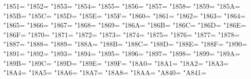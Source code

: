 \XeTeXcharclass"1851=\KclassArabD
\XeTeXcharclass"1852=\KclassArabD
\XeTeXcharclass"1853=\KclassArabD
\XeTeXcharclass"1854=\KclassArabD
\XeTeXcharclass"1855=\KclassArabD
\XeTeXcharclass"1856=\KclassArabD
\XeTeXcharclass"1857=\KclassArabD
\XeTeXcharclass"1858=\KclassArabD
\XeTeXcharclass"1859=\KclassArabD
\XeTeXcharclass"185A=\KclassArabD
\XeTeXcharclass"185B=\KclassArabD
\XeTeXcharclass"185C=\KclassArabD
\XeTeXcharclass"185D=\KclassArabD
\XeTeXcharclass"185E=\KclassArabD
\XeTeXcharclass"185F=\KclassArabD
\XeTeXcharclass"1860=\KclassArabD
\XeTeXcharclass"1861=\KclassArabD
\XeTeXcharclass"1862=\KclassArabD
\XeTeXcharclass"1863=\KclassArabD
\XeTeXcharclass"1864=\KclassArabD
\XeTeXcharclass"1865=\KclassArabD
\XeTeXcharclass"1866=\KclassArabD
\XeTeXcharclass"1867=\KclassArabD
\XeTeXcharclass"1868=\KclassArabD
\XeTeXcharclass"1869=\KclassArabD
\XeTeXcharclass"186A=\KclassArabD
\XeTeXcharclass"186B=\KclassArabD
\XeTeXcharclass"186C=\KclassArabD
\XeTeXcharclass"186D=\KclassArabD
\XeTeXcharclass"186E=\KclassArabD
\XeTeXcharclass"186F=\KclassArabD
\XeTeXcharclass"1870=\KclassArabD
\XeTeXcharclass"1871=\KclassArabD
\XeTeXcharclass"1872=\KclassArabD
\XeTeXcharclass"1873=\KclassArabD
\XeTeXcharclass"1874=\KclassArabD
\XeTeXcharclass"1875=\KclassArabD
\XeTeXcharclass"1876=\KclassArabD
\XeTeXcharclass"1877=\KclassArabD
\XeTeXcharclass"1878=\KclassArabD
\XeTeXcharclass"1887=\KclassArabD
\XeTeXcharclass"1888=\KclassArabD
\XeTeXcharclass"1889=\KclassArabD
\XeTeXcharclass"188A=\KclassArabD
\XeTeXcharclass"188B=\KclassArabD
\XeTeXcharclass"188C=\KclassArabD
\XeTeXcharclass"188D=\KclassArabD
\XeTeXcharclass"188E=\KclassArabD
\XeTeXcharclass"188F=\KclassArabD
\XeTeXcharclass"1890=\KclassArabD
\XeTeXcharclass"1891=\KclassArabD
\XeTeXcharclass"1892=\KclassArabD
\XeTeXcharclass"1893=\KclassArabD
\XeTeXcharclass"1894=\KclassArabD
\XeTeXcharclass"1895=\KclassArabD
\XeTeXcharclass"1896=\KclassArabD
\XeTeXcharclass"1897=\KclassArabD
\XeTeXcharclass"1898=\KclassArabD
\XeTeXcharclass"1899=\KclassArabD
\XeTeXcharclass"189A=\KclassArabD
\XeTeXcharclass"189B=\KclassArabD
\XeTeXcharclass"189C=\KclassArabD
\XeTeXcharclass"189D=\KclassArabD
\XeTeXcharclass"189E=\KclassArabD
\XeTeXcharclass"189F=\KclassArabD
\XeTeXcharclass"18A0=\KclassArabD
\XeTeXcharclass"18A1=\KclassArabD
\XeTeXcharclass"18A2=\KclassArabD
\XeTeXcharclass"18A3=\KclassArabD
\XeTeXcharclass"18A4=\KclassArabD
\XeTeXcharclass"18A5=\KclassArabD
\XeTeXcharclass"18A6=\KclassArabD
\XeTeXcharclass"18A7=\KclassArabD
\XeTeXcharclass"18A8=\KclassArabD
\XeTeXcharclass"18AA=\KclassArabD
\XeTeXcharclass"A840=\KclassArabD
\XeTeXcharclass"A841=\KclassArabD
